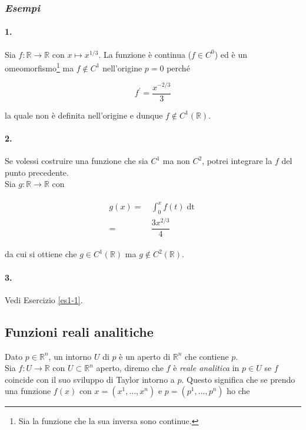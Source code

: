 \subsubsection{\textit{Esempi}}

\paragraph{1.}

Sia $ f : \mathbb{R} \to \mathbb{R} $ con $ x \mapsto x^{1/3} $. La funzione è continua ($ f \in C^{0} $) ed è un omeomorfismo\footnote{%
	Sia la funzione che la sua inversa sono continue.%
} ma $ f \notin C^{1} $ nell'origine $ p = 0 $ perché

\begin{equation}
	f^{\prime} = \dfrac{x^{-2/3}}{3}
\end{equation}

la quale non è definita nell'origine e dunque $ f \notin C^{1} (\mathbb{R}) $.

\paragraph{2.}

Se volessi costruire una funzione che sia $ C^{1} $ ma non $ C^{2} $, potrei integrare la $ f $ del punto precedente.\\
Sia $ g : \mathbb{R} \to \mathbb{R} $ con

\begin{align}
	\begin{split}
		g (x) =& \, \int_{0}^{x} f (t) \operatorname{dt}\\
		=& \, \dfrac{3 x^{2/3}}{4}
	\end{split} 
\end{align}

da cui si ottiene che $ g \in C^{1} (\mathbb{R}) $ ma $ g \notin C^{2} (\mathbb{R}) $.

\paragraph{3.}

Vedi Esercizio \ref{es1-1}.

\subsection{Funzioni reali analitiche}

Dato $ p \in \mathbb{R}^{n} $, un intorno $ U $ di $ p $ è un aperto di $ \mathbb{R}^{n} $ che contiene $ p $.\\
Sia $ f : U \to \mathbb{R} $ con $ U \subset \mathbb{R}^{n} $ aperto, diremo che $ f $ è \textit{reale analitica} in $ p \in U $ se $ f $ coincide con il suo sviluppo di Taylor intorno a $ p $. Questo significa che se prendo una funzione $ f (x) $ con $ x = (x^{1}, \dots, x^{n}) $ e $ p = (p^{1}, \dots, p^{n}) $ ho che

